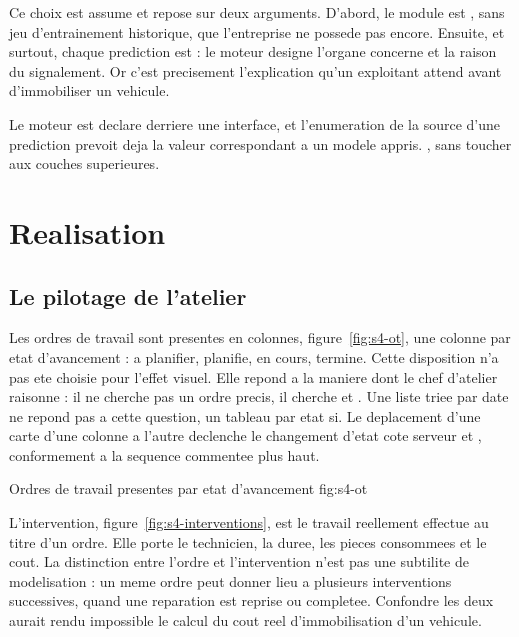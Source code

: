 Ce choix est assume et repose sur deux arguments. D'abord, le module est
, sans jeu d'entrainement historique, que
l'entreprise ne possede pas encore. Ensuite, et surtout, chaque
prediction est  : le moteur designe l'organe
concerne et la raison du signalement. Or c'est precisement l'explication
qu'un exploitant attend avant d'immobiliser un vehicule.

Le moteur est declare derriere une interface, et l'enumeration de la
source d'une prediction prevoit deja la valeur correspondant a un modele
appris. , sans toucher aux couches superieures.

\section{Realisation}

\subsection{Le pilotage de l'atelier}

Les ordres de travail sont presentes en colonnes, figure~\ref{fig:s4-ot},
une colonne par etat d'avancement : a planifier, planifie, en cours,
termine. Cette disposition n'a pas ete choisie pour l'effet visuel. Elle
repond a la maniere dont le chef d'atelier raisonne : il ne cherche pas un
ordre precis, il cherche  et . Une liste triee par date ne repond pas a cette question, un
tableau par etat si. Le deplacement d'une carte d'une colonne a l'autre
declenche le changement d'etat cote serveur et , conformement a la sequence commentee plus haut.

  {Ordres de travail presentes par etat d'avancement}
  {fig:s4-ot}

L'intervention, figure~\ref{fig:s4-interventions}, est le travail
reellement effectue au titre d'un ordre. Elle porte le technicien, la
duree, les pieces consommees et le cout. La distinction entre l'ordre et
l'intervention n'est pas une subtilite de modelisation : un meme ordre
peut donner lieu a plusieurs interventions successives, quand une
reparation est reprise ou completee. Confondre les deux aurait rendu
impossible le calcul du cout reel d'immobilisation d'un vehicule.

